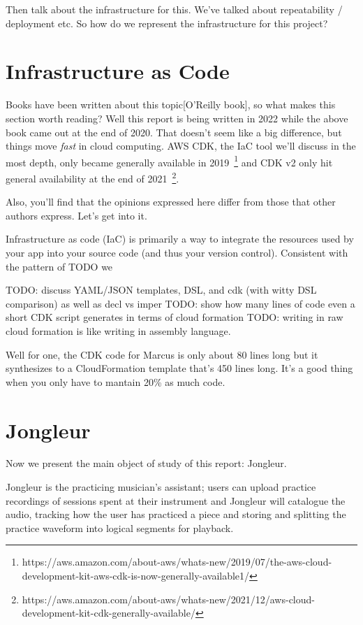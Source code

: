 \documentclass{article}
\begin{document}
Then talk about the infrastructure for this.
We've talked about repeatability / deployment etc.
So how do we represent the infrastructure for this project?

\section{Infrastructure as Code}

Books have been written about this topic[O'Reilly book], so what makes this section worth reading?
Well this report is being written in 2022 while the above book came out at the end of 2020.
That doesn't seem like a big difference, but things move \textit{fast} in cloud computing.
AWS CDK, the IaC tool we'll discuss in the most depth, only became generally available in 2019~\footnote{https://aws.amazon.com/about-aws/whats-new/2019/07/the-aws-cloud-development-kit-aws-cdk-is-now-generally-available1/} and CDK v2 only hit general availability at the end of 2021~\footnote{https://aws.amazon.com/about-aws/whats-new/2021/12/aws-cloud-development-kit-cdk-generally-available/}.

Also, you'll find that the opinions expressed here differ from those that other authors express. Let's get into it.

Infrastructure as code (IaC) is primarily a way to integrate the resources used by your app into your source code (and thus your version control).
Consistent with the pattern of TODO we 

TODO: discuss YAML/JSON templates, DSL, and cdk (with witty DSL comparison) as well as decl vs imper
TODO: show how many lines of code even a short CDK script generates in terms of cloud formation
TODO: writing in raw cloud formation is like writing in assembly language.

Well for one, the CDK code for Marcus is only about 80 lines long but it synthesizes to a CloudFormation template that's 450 lines long.
It's a good thing when you only have to mantain 20\% as much code.

\section{Jongleur}

Now we present the main object of study of this report: Jongleur.

Jongleur is the practicing musician's assistant; users can upload practice recordings of sessions spent at their instrument and Jongleur will catalogue the audio, tracking how the user has practiced a piece and storing and splitting the practice waveform into logical segments for playback.
\end{document}
